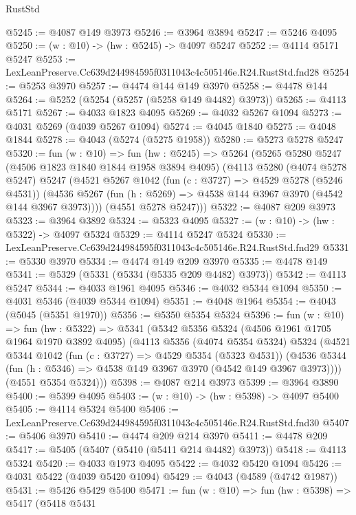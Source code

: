 \begin{lexlean}{RustStd}
\begin{coremodule}
@5245 := @4087 @149 @3973
@5246 := @3964 @3894
@5247 := @5246 @4095
@5250 := (w : @10) -> (hw : @5245) -> @4097 @5247
@5252 := @4114 @5171 @5247
@5253 := LexLeanPreserve.Cc639d244984595f0311043c4c505146e.R24.RustStd.fnd28
@5254 := @5253 @3970
@5257 := @4474 @144 @149 @3970
@5258 := @4478 @144
@5264 := @5252 (@5254 (@5257 (@5258 @149 @4482) @3973))
@5265 := @4113 @5171
@5267 := @4033 @1823 @4095
@5269 := @4032 @5267 @1094
@5273 := @4031 @5269 (@4039 @5267 @1094)
@5274 := @4045 @1840
@5275 := @4048 @1844
@5278 := @4043 (@5274 (@5275 @1958))
@5280 := @5273 @5278 @5247
@5320 := fun (w : @10) =>
  fun (hw : @5245) =>
  @5264
    (@5265
      @5280
      @5247
      (@4506 @1823 @1840 @1844 @1958 @3894 @4095)
      (@4113
        @5280
        (@4074 @5278 @5247)
        @5247
        (@4521
          @5267
          @1042
          (fun (c : @3727) => @4529 @5278 (@5246 @4531))
          (@4536 @5267 (fun (h : @5269) => @4538 @144 @3967 @3970 (@4542 @144 @3967 @3973))))
        (@4551 @5278 @5247)))
@5322 := @4087 @209 @3973
@5323 := @3964 @3892
@5324 := @5323 @4095
@5327 := (w : @10) -> (hw : @5322) -> @4097 @5324
@5329 := @4114 @5247 @5324
@5330 := LexLeanPreserve.Cc639d244984595f0311043c4c505146e.R24.RustStd.fnd29
@5331 := @5330 @3970
@5334 := @4474 @149 @209 @3970
@5335 := @4478 @149
@5341 := @5329 (@5331 (@5334 (@5335 @209 @4482) @3973))
@5342 := @4113 @5247
@5344 := @4033 @1961 @4095
@5346 := @4032 @5344 @1094
@5350 := @4031 @5346 (@4039 @5344 @1094)
@5351 := @4048 @1964
@5354 := @4043 (@5045 (@5351 @1970))
@5356 := @5350 @5354 @5324
@5396 := fun (w : @10) =>
  fun (hw : @5322) =>
  @5341
    (@5342
      @5356
      @5324
      (@4506 @1961 @1705 @1964 @1970 @3892 @4095)
      (@4113
        @5356
        (@4074 @5354 @5324)
        @5324
        (@4521
          @5344
          @1042
          (fun (c : @3727) => @4529 @5354 (@5323 @4531))
          (@4536 @5344 (fun (h : @5346) => @4538 @149 @3967 @3970 (@4542 @149 @3967 @3973))))
        (@4551 @5354 @5324)))
@5398 := @4087 @214 @3973
@5399 := @3964 @3890
@5400 := @5399 @4095
@5403 := (w : @10) -> (hw : @5398) -> @4097 @5400
@5405 := @4114 @5324 @5400
@5406 := LexLeanPreserve.Cc639d244984595f0311043c4c505146e.R24.RustStd.fnd30
@5407 := @5406 @3970
@5410 := @4474 @209 @214 @3970
@5411 := @4478 @209
@5417 := @5405 (@5407 (@5410 (@5411 @214 @4482) @3973))
@5418 := @4113 @5324
@5420 := @4033 @1973 @4095
@5422 := @4032 @5420 @1094
@5426 := @4031 @5422 (@4039 @5420 @1094)
@5429 := @4043 (@4589 (@4742 @1987))
@5431 := @5426 @5429 @5400
@5471 := fun (w : @10) =>
  fun (hw : @5398) =>
  @5417
    (@5418
      @5431

\end{coremodule}
\end{lexlean}

